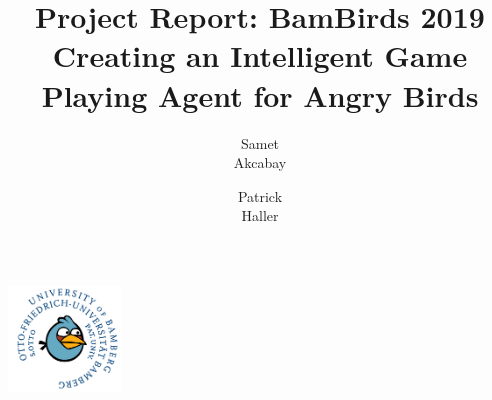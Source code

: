 \documentclass[11pt]{article}
\begin{document}
	\begin{titlepage}
		\begin{center}
			\title{Project Report: BamBirds 2019\\
				{\small Creating  an Intelligent Game Playing Agent for Angry Birds}}
			\includegraphics[width=3cm,height=3cm]{img/logo.png}
			\author{Samet\\Akcabay\and
			Patrick\\Haller}
		\end{center}
	\end{titlepage}
\maketitle
\newpage
\tableofcontents
\newpage








\end{document}

